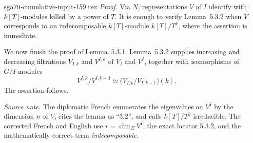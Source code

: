 \begin{filecontents*}{sga7ii-cumulative-input-159.tex}
\medskip
\noindent\emph{Proof.}
Via $N$, representations $V$ of $I$ identify with $k[T]$-modules killed by
a power of $T$.  It is enough to verify Lemma~5.3.2 when $V$ corresponds to
an indecomposable $k[T]$-module $k[T]/T^k$, where the assertion is immediate.

We now finish the proof of Lemma~5.3.1.  Lemma~5.3.2 supplies increasing and
decreasing filtrations $V_{I,k}$ and $V^{I,k}$ of $V_I$ and $V^I$, together
with isomorphisms of $G/I$-modules
\[
V^{I,k}/V^{I,k+1}\simeq
\bigl(V_{I,k}/V_{I,k-1}\bigr)(k).
\]
The assertion follows.

\medskip
\noindent\emph{Source note.}
The diplomatic French enumerates the eigenvalues on $V^I$ by the dimension
$n$ of $V$, cites the lemma as ``3.2'', and calls $k[T]/T^k$ irreducible.
The corrected French and English use $r=\dim_E V^I$, the exact locator
5.3.2, and the mathematically correct term \emph{indecomposable}.
\end{filecontents*}
